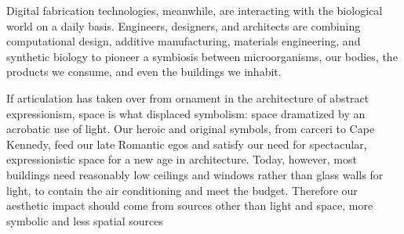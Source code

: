 


Digital fabrication technologies, meanwhile, are interacting with the biological world on a daily basis.
Engineers, designers, and architects are combining computational design, additive manufacturing, materials engineering, and synthetic biology to pioneer a symbiosis between microorganisms, our bodies, the products we consume, and even the buildings we inhabit\cite{Schwab2016}.


    If articulation has taken over from ornament in the architecture of abstract expressionism, space is what displaced symbolism: space dramatized by an acrobatic use of light.
    Our heroic and original symbols, from carceri to Cape Kennedy, feed our late Romantic egos and satisfy our need for spectacular, expressionistic space for a new age in architecture.
    Today, however, most buildings need reasonably low ceilings and windows rather than glass walls for light, to contain the air conditioning and meet the budget.
    Therefore our aesthetic impact should come from sources other than light and space, more symbolic and less spatial sources\cite{Venturi1971}



